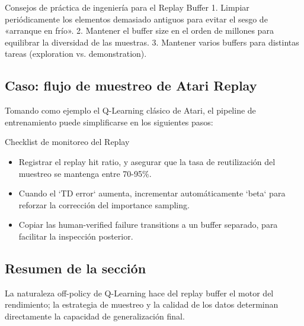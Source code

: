 \begin{knowledgebox}{Consejos de práctica de ingeniería para el Replay Buffer}
1. Limpiar periódicamente los elementos demasiado antiguos para evitar el sesgo de «arranque en frío». 2. Mantener el buffer size en el orden de millones para equilibrar la diversidad de las muestras. 3. Mantener varios buffers para distintas tareas (exploration vs. demonstration).
\end{knowledgebox}

\subsection{Caso: flujo de muestreo de Atari Replay}

Tomando como ejemplo el Q-Learning clásico de Atari, el pipeline de entrenamiento puede simplificarse en los siguientes pasos:


\begin{importantbox}{Checklist de monitoreo del Replay}
\begin{itemize}
    \item Registrar el replay hit ratio, y asegurar que la tasa de reutilización del muestreo se mantenga entre 70-95\%.
    \item Cuando el `TD error` aumenta, incrementar automáticamente `beta` para reforzar la corrección del importance sampling.
    \item Copiar las human-verified failure transitions a un buffer separado, para facilitar la inspección posterior.
\end{itemize}
\end{importantbox}

\subsection{Resumen de la sección}

La naturaleza off-policy de Q-Learning hace del replay buffer el motor del rendimiento; la estrategia de muestreo y la calidad de los datos determinan directamente la capacidad de generalización final.

